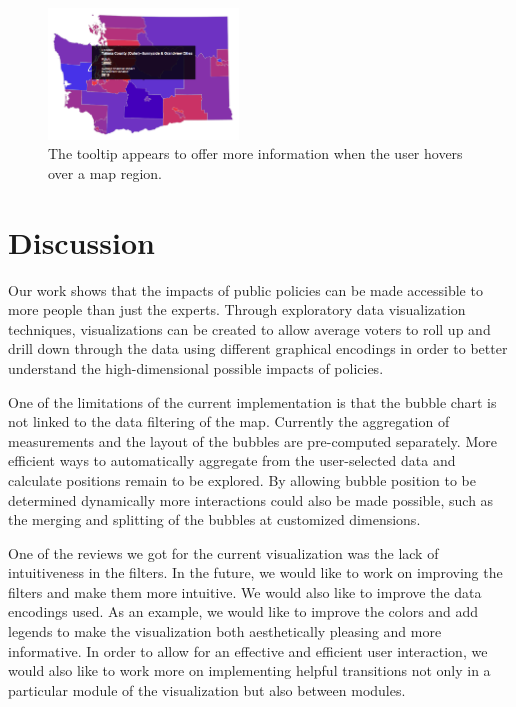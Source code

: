 \documentclass{sigchi}
\begin{document}
\begin{figure}
\centering
\includegraphics[width=0.45\textwidth]{mapTooltip}
\caption{The tooltip appears to offer more information when the user hovers over a map region. }
\label{fig:mapTooltip}
\end{figure}

\section{Discussion}
Our work shows that the impacts of public policies can be made accessible to more people than just the experts. Through exploratory data visualization techniques, visualizations can be created to allow average voters to roll up and drill down through the data using different graphical encodings in order to better understand the high-dimensional possible impacts of policies. 

One of the limitations of the current implementation is that the bubble chart is not linked to the data filtering of the map. Currently the aggregation of measurements and the layout of the bubbles are pre-computed separately. More efficient ways to automatically aggregate from the user-selected data and calculate positions remain to be explored. By allowing bubble position to be determined dynamically more interactions could also be made possible, such as the merging and splitting of the bubbles at customized dimensions. 

One of the reviews we got for the current visualization was the lack of intuitiveness in the filters. In the future, we would like to work on improving the filters and make them more intuitive. We would also like to improve the data encodings used. As an example, we would like to improve the colors and add legends to make the visualization both aesthetically pleasing and more informative. In order to allow for an effective and efficient user interaction, we would also like to work more on implementing helpful transitions not only in a particular module of the visualization but also between modules.
\end{document}

